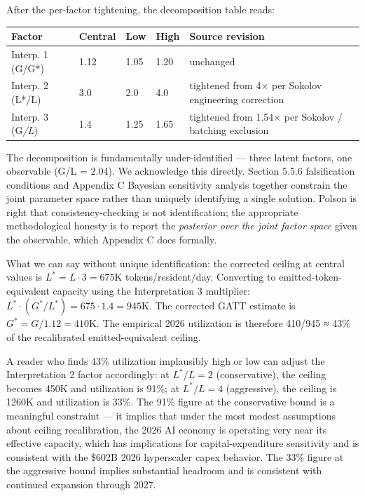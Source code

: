 \documentclass[11pt,a4paper]{article}
\begin{document}
After the per-factor tightening, the decomposition table reads:

\begin{center}
\begin{tabular}{lllll}
\toprule
Factor & Central & Low & High & Source revision \\
\midrule
Interp. 1 (G/G*) & 1.12 & 1.05 & 1.20 & unchanged \\
Interp. 2 (L*/L) & 3.0 & 2.0 & 4.0 & tightened from 4× per Sokolov engineering correction \\
Interp. 3 (G\emph{/L}) & 1.4 & 1.25 & 1.65 & tightened from 1.54× per Sokolov / batching exclusion \\
\bottomrule
\end{tabular}
\end{center}


The decomposition is fundamentally under-identified --- three latent factors, one observable (G/L = 2.04). We acknowledge this directly. Section 5.5.6 falsification conditions and Appendix C Bayesian sensitivity analysis together constrain the joint parameter space rather than uniquely identifying a single solution. Polson is right that consistency-checking is not identification; the appropriate methodological honesty is to report the \emph{posterior over the joint factor space} given the observable, which Appendix C does formally.

What we can say without unique identification: the corrected ceiling at central values is $L^{*} = L \cdot 3 = 675$K tokens/resident/day. Converting to emitted-token-equivalent capacity using the Interpretation 3 multiplier: $L^{*} \cdot (G^{*}/L^{*}) = 675 \cdot 1.4 = 945$K. The corrected GATT estimate is $G^{*} = G / 1.12 = 410$K. The empirical 2026 utilization is therefore 410/945 ≈ 43\% of the recalibrated emitted-equivalent ceiling.

A reader who finds 43\% utilization implausibly high or low can adjust the Interpretation 2 factor accordingly: at $L^{*}/L = 2$ (conservative), the ceiling becomes 450K and utilization is 91\%; at $L^{*}/L = 4$ (aggressive), the ceiling is 1260K and utilization is 33\%. The 91\% figure at the conservative bound is a meaningful constraint --- it implies that under the most modest assumptions about ceiling recalibration, the 2026 AI economy is operating very near its effective capacity, which has implications for capital-expenditure sensitivity and is consistent with the \$602B 2026 hyperscaler capex behavior. The 33\% figure at the aggressive bound implies substantial headroom and is consistent with continued expansion through 2027.
\end{document}
